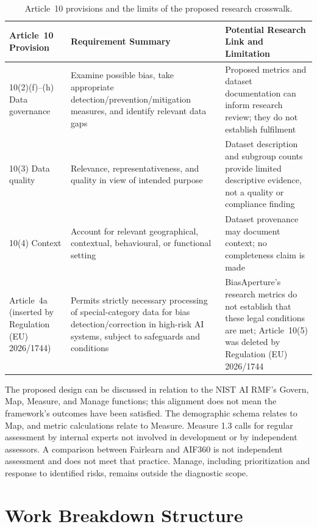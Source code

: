 \begin{table}[htbp]
    \centering
    \renewcommand{\arraystretch}{1.3}
    \caption{Article~10 provisions and the limits of the proposed research crosswalk.}
    \label{tab:art10}
    \begin{tabular}{p{2.6cm}p{4.7cm}p{5.2cm}}
        \toprule
        \textbf{Article~10 Provision} & \textbf{Requirement Summary} & \textbf{Potential Research Link and Limitation} \\
        \midrule
        10(2)(f)--(h) Data governance & Examine possible bias, take appropriate detection/prevention/mitigation measures, and identify relevant data gaps & Proposed metrics and dataset documentation can inform research review; they do not establish fulfilment \\
        10(3) Data quality & Relevance, representativeness, and quality in view of intended purpose & Dataset description and subgroup counts provide limited descriptive evidence, not a quality or compliance finding \\
        10(4) Context & Account for relevant geographical, contextual, behavioural, or functional setting & Dataset provenance may document context; no completeness claim is made \\
        Article~4a (inserted by Regulation (EU) 2026/1744) & Permits strictly necessary processing of special-category data for bias detection/correction in high-risk AI systems, subject to safeguards and conditions & BiasAperture's research metrics do not establish that these legal conditions are met; Article~10(5) was deleted by Regulation (EU) 2026/1744 \cite{euomnibus2026} \\
        \bottomrule
    \end{tabular}
\end{table}

The proposed design can be discussed in relation to the NIST AI RMF's Govern, Map, Measure, and Manage functions; this alignment does not mean the framework's outcomes have been satisfied. The demographic schema relates to Map, and metric calculations relate to Measure. Measure 1.3 calls for regular assessment by internal experts not involved in development or by independent assessors. A comparison between Fairlearn and AIF360 is not independent assessment and does not meet that practice. Manage, including prioritization and response to identified risks, remains outside the diagnostic scope.

\section{Work Breakdown Structure}
\label{sec:wbs}

